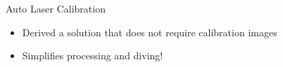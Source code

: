 




\begin{frame}{Auto Laser Calibration}
    \begin{itemize}
      \item Derived a solution that does not require calibration images 
      \item Simplifies processing and diving!
    \end{itemize}
\end{frame}

